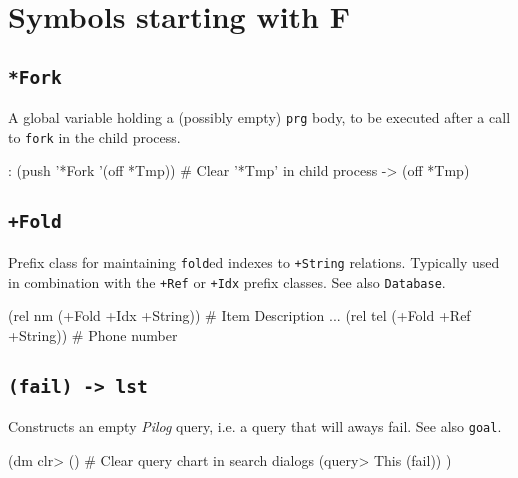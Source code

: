 %
%
%



\chapter{Symbols starting with F}
\label{sec:func-ref-F-functions-starting-with-F}


 
\section*{\texttt{*Fork}}
\label{sec:func-ref-F-*Fork}


A global variable holding a (possibly empty) \texttt{prg} body, to be executed
after a call to \texttt{fork} in the child process.


\begin{wideverbatim}
: (push '*Fork '(off *Tmp))   # Clear '*Tmp' in child process
-> (off *Tmp)
\end{wideverbatim}

 
\section*{\texttt{+Fold}}
\label{sec:func-ref-F-+Fold}


Prefix class for maintaining \texttt{fold}ed indexes to
\texttt{+String} relations. Typically used in combination with the
\texttt{+Ref} or \texttt{+Idx} prefix classes. See also
\texttt{Database}.


\begin{wideverbatim}
(rel nm (+Fold +Idx +String))   # Item Description
...
(rel tel (+Fold +Ref +String))  # Phone number
\end{wideverbatim}

 
\section*{\texttt{(fail) -> lst}}
\label{sec:func-ref-F-(fail) -> lst}


Constructs an empty \emph{Pilog} query, i.e. a query that
will aways fail. See also \texttt{goal}.


\begin{wideverbatim}
(dm clr> ()                # Clear query chart in search dialogs
   (query> This (fail)) )
\end{wideverbatim}

